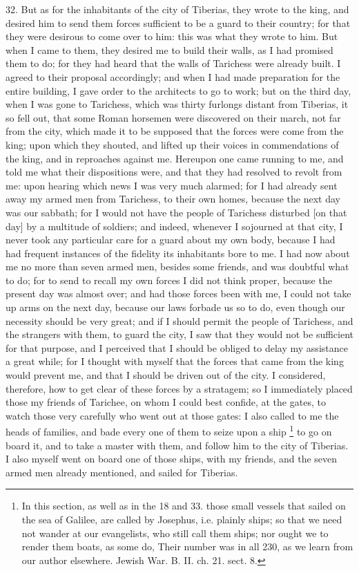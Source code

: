 32. But as for the inhabitants of the city of Tiberias, they wrote to the
king, and desired him to send them forces sufficient to be a guard to
their country; for that they were desirous to come over to him: this was
what they wrote to him. But when I came to them, they desired me to build
their walls, as I had promised them to do; for they had heard that the
walls of Tarichess were already built. I agreed to their proposal
accordingly; and when I had made preparation for the entire building, I
gave order to the architects to go to work; but on the third day, when I
was gone to Tarichess, which was thirty furlongs distant from Tiberias, it
so fell out, that some Roman horsemen were discovered on their march, not
far from the city, which made it to be supposed that the forces were come
from the king; upon which they shouted, and lifted up their voices in
commendations of the king, and in reproaches against me. Hereupon one came
running to me, and told me what their dispositions were, and that they had
resolved to revolt from me: upon hearing which news I was very much
alarmed; for I had already sent away my armed men from Tarichess, to their
own homes, because the next day was our sabbath; for I would not have the
people of Tarichess disturbed [on that day] by a multitude of soldiers;
and indeed, whenever I sojourned at that city, I never took any particular
care for a guard about my own body, because I had had frequent instances
of the fidelity its inhabitants bore to me. I had now about me no more
than seven armed men, besides some friends, and was doubtful what to do;
for to send to recall my own forces I did not think proper, because the
present day was almost over; and had those forces been with me, I could
not take up arms on the next day, because our laws forbade us so to do,
even though our necessity should be very great; and if I should permit the
people of Tarichess, and the strangers with them, to guard the city, I saw
that they would not be sufficient for that purpose, and I perceived that I
should be obliged to delay my assistance a great while; for I thought with
myself that the forces that came from the king would prevent me, and that
I should be driven out of the city. I considered, therefore, how to get
clear of these forces by a stratagem; so I immediately placed those my
friends of Tarichee, on whom I could best confide, at the gates, to watch
those very carefully who went out at those gates: I also called to me the
heads of families, and bade every one of them to seize upon a ship \footnote{In this section, as well
as in the 18 and 33. those small vessels that sailed on the sea of
Galilee, are called by Josephus, i.e. plainly ships; so that we need not
wander at our evangelists, who still call them ships; nor ought we to
render them boats, as some do, Their number was in all 230, as we learn
from our author elsewhere. Jewish War. B. II. ch. 21. sect. 8.}
to go on board it, and to take a master with them, and follow him to the
city of Tiberias. I also myself went on board one of those ships, with my
friends, and the seven armed men already mentioned, and sailed for
Tiberias.

